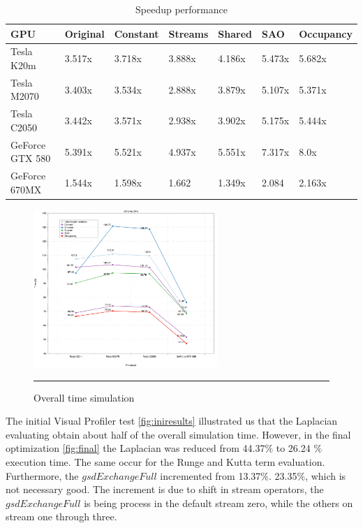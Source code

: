   \begin{table}[h]
\centering
  \begin{tabular} { |  l  |  l | l  |  l  | l | l | l |}
    \hline
    GPU & Original & Constant & Streams & Shared & SAO & Occupancy\\
    \hline
    Tesla K20m & 3.517x & 3.718x & 3.888x & 4.186x & 5.473x & 5.682x\\
   \hline
    Tesla M2070 & 3.403x & 3.534x & 2.888x & 3.879x & 5.107x & 5.371x\\
    \hline
    Tesla C2050 & 3.442x & 3.571x & 2.938x & 3.902x & 5.175x & 5.444x\\
   \hline
    GeForce GTX 580 & 5.391x & 5.521x & 4.937x & 5.551x & 7.317x & 8.0x\\
   \hline
    GeForce 670MX & 1.544x & 1.598x & 1.662 & 1.349x & 2.084 & 2.163x\\
   \hline
  \end{tabular}
    \caption{Speedup performance}
  \label{tab:speed}
  \end{table}

\begin{figure}[htbp]
	\centering
		\includegraphics[width=0.62\textwidth]{Figures/gpuOptimization.png}
		\rule{35em}{0.2pt}
	\caption[Overall time simulation]{Overall time simulation}
	\label{fig:sao}
\end{figure}

The initial Visual Profiler test \ref{fig:iniresults} illustrated us that the Laplacian evaluating obtain about half of the overall simulation time. However, in the final optimization \ref{fig:final} the Laplacian was reduced from 44.37$\%$ to 26.24 $\%$ execution time. The same occur for the Runge and Kutta term evaluation. Furthermore, the $gsdExchangeFull$ incremented from 13.37$\%$. 23.35$\%$, which is not necessary good. The increment is due to shift in stream operators, the  $gsdExchangeFull$ is being process in the default stream zero, while the others on stream one through three. 

